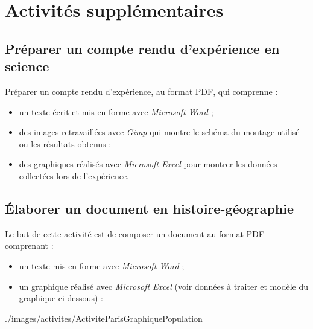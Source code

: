 \chapter{Activités supplémentaires}


 

\section{Préparer un compte rendu d'expérience en science}

Préparer un compte rendu d'expérience, au format PDF, qui comprenne :

\begin{itemize}
\item un texte écrit et mis en forme avec \emph{Microsoft Word} ;
\item des images retravaillées avec \emph{Gimp} qui montre le schéma du montage utilisé ou les résultats obtenus ;
\item des graphiques réalisés avec \emph{Microsoft Excel} pour montrer les données collectées lors de l'expérience.
\end{itemize}





\newpage


\section{Élaborer un document en histoire-géographie}



Le but de cette activité est de composer un document au format PDF comprenant :
\begin{itemize}
\item un texte mis en forme avec \emph{Microsoft Word} ;
\item un graphique réalisé avec \emph{Microsoft Excel} (voir données à traiter et modèle du graphique ci-dessous) :

\end{itemize}
%
              {./images/activites/ActiviteParisGraphiquePopulation}{\textwidth}



